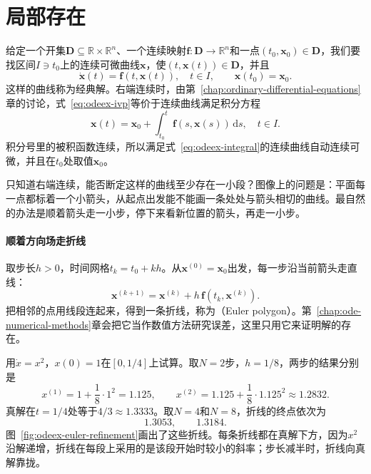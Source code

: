 \section{局部存在}
\label{sec:odeex-local-existence}

给定一个开集$\bm{D}\subseteq\mathbb{R}\times\mathbb{R}^{n}$、一个连续映射$\bm{f}:\bm{D}\to\mathbb{R}^{n}$和一点$(t_0,\bm{x}_0)\in\bm{D}$，我们要找区间$I\ni t_0$上的连续可微曲线$\bm{x}$，使$(t,\bm{x}(t))\in\bm{D}$，并且
\begin{equation}
 \dot{\bm{x}}(t)=\bm{f}(t,\bm{x}(t)),\quad t\in I,\qquad \bm{x}(t_0)=\bm{x}_0.
 \label{eq:odeex-ivp}
\end{equation}
这样的曲线称为经典解。右端连续时，由第~\ref{chap:ordinary-differential-equations}章的讨论，式~\eqref{eq:odeex-ivp}等价于连续曲线满足积分方程
\begin{equation}
 \bm{x}(t)=\bm{x}_0+\int_{t_0}^{t}\bm{f}(s,\bm{x}(s))\,\mathrm{d}s,\quad t\in I.
 \label{eq:odeex-integral}
\end{equation}
积分号里的被积函数连续，所以满足式~\eqref{eq:odeex-integral}的连续曲线自动连续可微，并且在$t_0$处取值$\bm{x}_0$。

只知道右端连续，能否断定这样的曲线至少存在一小段？图像上的问题是：平面每一点都标着一个小箭头，从起点出发能不能画一条处处与箭头相切的曲线。最自然的办法是顺着箭头走一小步，停下来看新位置的箭头，再走一小步。

\paragraph{顺着方向场走折线}
取步长$h>0$，时间网格$t_k=t_0+kh$。从$\bm{x}^{(0)}=\bm{x}_0$出发，每一步沿当前箭头走直线：
\begin{equation}
 \bm{x}^{(k+1)}=\bm{x}^{(k)}+h\,\bm{f}(t_k,\bm{x}^{(k)}).
 \label{eq:odeex-euler-node}
\end{equation}
把相邻的点用线段连起来，得到一条折线，称为（Euler polygon）。第~\ref{chap:ode-numerical-methods}章会把它当作数值方法研究误差，这里只用它来证明解的存在。

用$\dot x=x^2$，$x(0)=1$在$[0,1/4]$上试算。取$N=2$步，$h=1/8$，两步的结果分别是
\[
 x^{(1)}=1+\frac18\cdot1^2=1.125,\qquad x^{(2)}=1.125+\frac18\cdot1.125^2\approx1.2832.
\]
真解在$t=1/4$处等于$4/3\approx1.3333$。取$N=4$和$N=8$，折线的终点依次为
\[
 1.3053,\qquad 1.3184.
\]
图~\ref{fig:odeex-euler-refinement}画出了这些折线。每条折线都在真解下方，因为$x^2$沿解递增，折线在每段上采用的是该段开始时较小的斜率；步长减半时，折线向真解靠拢。

